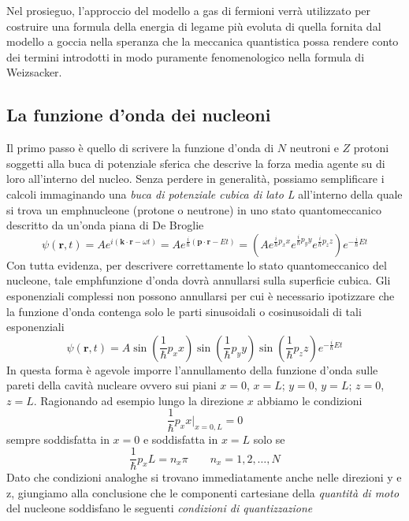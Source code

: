 Nel prosieguo, l’approccio del modello a gas di fermioni verrà utilizzato per costruire una formula della energia di legame più evoluta di quella fornita dal modello a goccia nella speranza che la meccanica quantistica possa rendere conto dei termini introdotti in modo puramente fenomenologico nella formula di Weizsacker.

\subsection{La funzione d'onda dei nucleoni}\label{sec:funzione-onda-nucleoni}

Il primo passo è quello di scrivere la funzione d’onda di $N$ neutroni e $Z$ protoni soggetti alla buca di potenziale sferica che descrive la forza media agente su di loro all’interno del nucleo.
Senza perdere in generalità, possiamo semplificare i calcoli immaginando una \emph{buca di potenziale cubica di lato L} all’interno della quale si trova un emph{nucleone} (protone o neutrone) in uno stato quantomeccanico descritto da un’onda piana di De Broglie
\[
\psi(\bm{r},t) = A e^{ i(\bm{k} \cdot \bm{r} - \omega t) } =
Ae^{ \frac{i}{\hslash} (\bm{p} \cdot \bm{r} -Et)  } =
(Ae^{ \frac{i}{\hslash}p_{x}x }e^{ \frac{i}{\hslash}p_{y}y }e^{ \frac{i}{\hslash}p_{z}z })e^{ - \frac{i}{\hslash}Et }
\]
Con tutta evidenza, per descrivere correttamente lo stato quantomeccanico del nucleone, tale emph{funzione d’onda dovrà annullarsi sulla superficie cubica}.
Gli esponenziali complessi non possono annullarsi per cui è necessario ipotizzare che la funzione d’onda contenga solo le parti sinusoidali o cosinusoidali di tali esponenziali
\begin{equation}
	\psi(\bm{r},t) = A \sin\left(  \frac{1}{\hslash}p_{x}x \right) \sin\left(  \frac{1}{\hslash}p_{y}y \right) \sin\left(  \frac{1}{\hslash}p_{z}z \right) e^{ - \frac{i}{\hslash}Et }
	\label{eq:wave-function-nucleon-fermion-gas-non-normalized}
\end{equation}
In questa forma è agevole imporre l’annullamento della funzione d’onda sulle pareti della cavità nucleare ovvero sui piani $x=0$, $x=L$;  $y=0$, $y=L$; $z=0$, $z=L$.
Ragionando ad esempio lungo la direzione $x$ abbiamo le condizioni
\[
\frac{1}{\hslash} p_{x}x \big|_{x = 0,L} = 0
\]
sempre soddisfatta in $x=0$ e soddisfatta in $x=L$ solo se
\[
\frac{1}{\hslash}p_{x}L = n_{x} \pi \qquad n_{x} = 1,2, \dots, N
\]
Dato che condizioni analoghe si trovano immediatamente anche nelle direzioni y e z, giungiamo alla conclusione che le componenti cartesiane della \emph{quantità di moto} del nucleone soddisfano le seguenti \emph{condizioni di quantizzazione}
